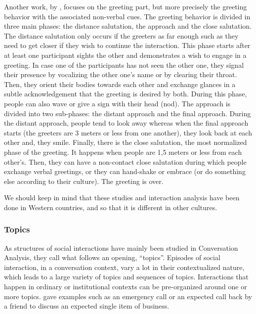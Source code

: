 \documentclass[a4paper,11pt,twoside]{StyleThese}
\begin{document}
Another work, by \cite{kendon_1990_conducting}, focuses on the greeting part, but more precisely the greeting behavior with the associated non-verbal cues. The greeting behavior is divided in three main phases: the distance salutation, the approach and the close salutation. 
The distance salutation only occurs if the greeters as far enough such as they need to get closer if they wish to continue the interaction. This phase starts after at least one participant sights the other and demonstrates a wish to engage in a greeting. In case one of the participants has not seen the other one, they signal their presence by vocalizing the other one’s name or by clearing their throat. Then, they orient their bodies towards each other and exchange glances in a subtle acknowledgement that the greeting is desired by both. During this phase, people can also wave or give a sign with their head (\eg nod).
The approach is divided into two sub-phases: the distant approach and the final approach. During the distant approach, people tend to look away whereas when the final approach starts (the greeters are 3 meters or less from one another), they look back at each other and, they smile.
Finally, there is the close salutation, the most normalized phase of the greeting. It happens when people are 1,5 meters or less from each other's. Then, they can have a non-contact close salutation during which people exchange verbal greetings, or they can hand-shake or embrace (or do something else according to their culture). The greeting is over.

We should keep in mind that these studies and interaction analysis have been done in Western countries, and so that it is different in other cultures.

\subsubsection{Topics}
As structures of social interactions have mainly been studied in Conversation Analysis, they call what follows an opening, ``topics''. Episodes of social interaction, in a conversation context, vary a lot in their contextualized nature, which leads to a large variety of topics and sequences of topics. Interactions that happen in ordinary or institutional contexts can be pre-organized around one or more topics. \cite{robinson_overall_2012} gave examples such as an emergency call or an expected call back by a friend to discuss an expected single item of business. 
\end{document}
